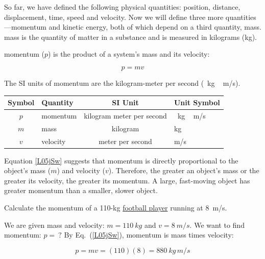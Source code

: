 \documentclass[main.tex]{subfiles}
\begin{document}
So far, we have defined the following physical quantities: position, distance, displacement, time, speed and velocity. Now we will define three more quantities---momentum and kinetic energy, both of which depend on a third quantity, mass. \Gls{mass} is the quantity of matter in a substance and is measured in kilograms (kg). 

\vspace{1em}

\Gls{momentum} ($p$) is the product of a system's mass and its velocity:

\begin{equation} \label{L05jSw}
    p = m v
\end{equation}

The SI units of momentum are the kilogram-meter per second (\SI{}{kg\,m/s}).

\begin{center}
    \begin{tabular}{cl|cl}
    \hline
    \textbf{Symbol} & \textbf{Quantity} & \textbf{SI Unit} & \textbf{Unit Symbol}  \\
    \hline\hline
    \rule{0pt}{2.5ex}
        $p$ & momentum & kilogram meter per second & \SI{}{kg\,m/s}\\
        $m$ & mass & kilogram & kg\\
        $v$ & velocity & meter per second & m/s\\
    \hline
    \end{tabular}
\end{center}

Equation \eqref{L05jSw} suggests that momentum is directly proportional to the object's mass ($m$) and velocity ($v$). Therefore, the greater an object's mass or the greater its velocity, the greater its momentum. A large, fast-moving object has greater momentum than a smaller, slower object. 

\begin{example} \label{lMBh9H}
    Calculate the momentum of a 110-kg \href{https://youtu.be/hxMaoFcYSrw}{football player} running at \SI{8}{m/s}.
\end{example}

\Solution We are given mass and velocity: $m = \SI{110}{kg}$ and $v = \SI{8}{m/s}$. We want to find momentum: $p =\ ?$ By Eq.~(\ref{L05jSw}), momentum is mass times velocity:

\begin{equation*}
    p = m v = (110)(8) = \SI{880}{kg\,m/s} 
\end{equation*}
\end{document}
